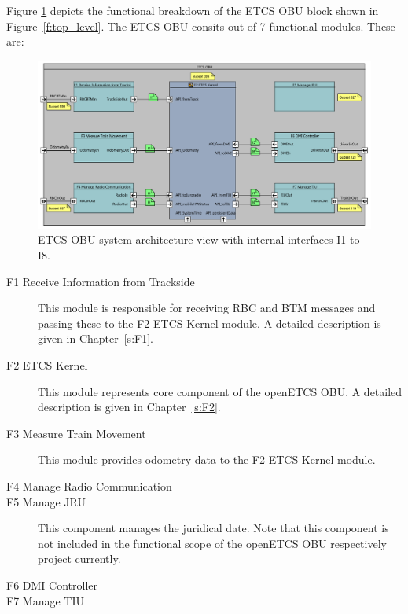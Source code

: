 Figure \ref{f:ETCS_OBU_decomposition} depicts the functional breakdown of the ETCS OBU block shown in Figure~\ref{f:top_level}. The ETCS OBU consits out of 7 functional modules. These are:
\begin{figure}
\centering
\includegraphics[width=\textwidth]{images/F2_ETCS_Kernel.pdf}
\caption{ETCS OBU system architecture view with internal interfaces I1 to I8.}
\label{f:ETCS_OBU_decomposition}
\end{figure}
\begin{description}
\item[F1 Receive Information from Trackside] This module is responsible for receiving RBC and BTM messages and passing these to the F2 ETCS Kernel module. A detailed description is given in Chapter~\ref{s:F1}.
\item[F2 ETCS Kernel] This module represents core component of the openETCS OBU. A detailed description is given in Chapter~\ref{s:F2}.
\item[F3 Measure Train Movement] This module provides odometry data to the F2 ETCS Kernel module.
\item[F4 Manage Radio Communication]
\item[F5 Manage JRU] This component manages the juridical date. Note that this component is not included in the functional scope of the openETCS OBU respectively project currently.
\item[F6 DMI Controller]
\item[F7 Manage TIU]
\end{description}

